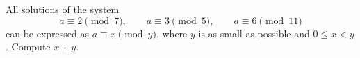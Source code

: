 All solutions of the system
\[a\equiv2\pmod7,\qquad a\equiv3\pmod5,\qquad a\equiv6\pmod{11}\]
can be expressed as $a\equiv x\pmod y$, where $y$ is as small as possible and $0\le x<y$. Compute $x+y$.
